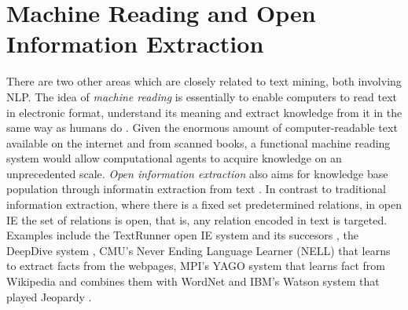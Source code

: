 \section{Machine Reading and Open Information Extraction}

There are two other areas which are closely related to text mining, both involving NLP.
The idea of \emph{machine reading} is essentially to enable computers to read text in electronic format, understand its meaning and extract knowledge from it in the same way as humans do \citep{Mitchell2005Reading}.
Given the enormous amount of computer-readable text available on the internet and from scanned books, a functional machine reading system would allow computational agents to acquire knowledge on an unprecedented scale.
\emph{Open information extraction} also aims for knowledge base population through informatin extraction from text \citet{banko2007open,Etzioni2011Search}.
In contrast to traditional information extraction, where there is a fixed set predetermined relations, in open IE the set of relations is open, that is, any relation encoded in text is targeted.  
Examples include the TextRunner open IE system and its succesors \citep{yates2007textrunner}, the DeepDive system \citep{niu2012deepdive}, CMU's Never Ending Language Learner (NELL) \citep{carlson-aaai} that learns to extract facts from the webpages,  MPI's YAGO system that learns fact from Wikipedia and combines them with WordNet \citep{YAGO} and IBM's Watson system that played Jeopardy \citep{fan2012automatic}.




